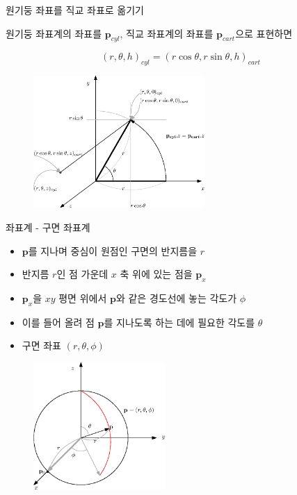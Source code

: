 \documentclass{beamer}
\begin{document}
\begin{frame}{원기둥 좌표를 직교 좌표로 옮기기}

원기둥 좌표계의 좌표를 $\mathbf p_{cyl}$, 직교 좌표계의 좌표를 $\mathbf p_{cart}$으로 표현하면

$$(r, \theta, h)_{cyl} = ( r \cos \theta , r \sin \theta, h)_{cart}$$

\begin{figure}[h!]
  \centering
    \includegraphics[width=6.5cm]{Math_transform/cyl2Cartesian.eps}
\end{figure}

\end{frame}


\begin{frame}{좌표계 - 구면 좌표계}

\begin{itemize}
\item $\mathbf p$를 지나며 중심이 원점인 구면의 반지름을 $r$
\item 반지름 $r$인 점 가운데  $x$ 축 위에 있는 점을 $\mathbf p_x$
\item $\mathbf p_x$을 $xy$ 평면 위에서 $\mathbf p$와 같은 경도선에 놓는 각도가 $\phi$
\item 이를 들어 올려 점 $\mathbf p$를 지나도록 하는 데에 필요한 각도를 $\theta$
\item 구면 좌표 $(r, \theta, \phi)$
\end{itemize}

\begin{figure}
    \includegraphics[width=5cm]{Math_transform/sphericalCoord.eps}
\end{figure}

\end{frame}
\end{document}
